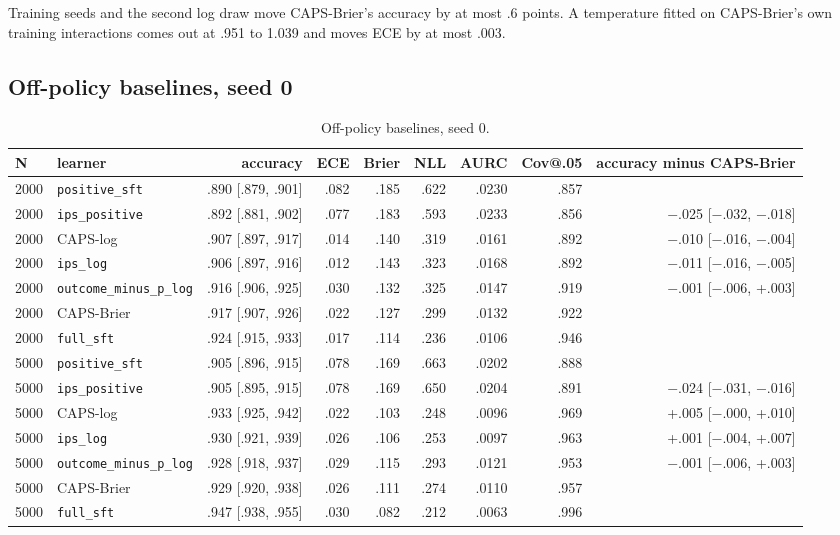 \documentclass[10pt,letterpaper]{article}
\theoremstyle{plain}
\begin{document}
Training seeds and the second log draw move CAPS-Brier's accuracy by at most .6 points. A temperature fitted on CAPS-Brier's own training interactions comes out at .951 to 1.039 and moves ECE by at most .003.

\subsection{Off-policy baselines, seed 0}\label{sec:A3}

\begin{table}[H]
\centering
\footnotesize
\setlength{\tabcolsep}{3pt}
\caption{Off-policy baselines, seed 0.}
\label{tab:A3}
\begin{adjustbox}{max width=\textwidth}
\begin{tabular}{llrrrrrrr}
\toprule
N & learner & accuracy & ECE & Brier & NLL & AURC & Cov@.05 & accuracy minus CAPS-Brier \\
\midrule
2000 & \texttt{positive\_sft} & .890 [.879, .901] & .082 & .185 & .622 & .0230 & .857 &  \\
2000 & \texttt{ips\_positive} & .892 [.881, .902] & .077 & .183 & .593 & .0233 & .856 & $-$.025 [$-$.032, $-$.018] \\
2000 & CAPS-log & .907 [.897, .917] & .014 & .140 & .319 & .0161 & .892 & $-$.010 [$-$.016, $-$.004] \\
2000 & \texttt{ips\_log} & .906 [.897, .916] & .012 & .143 & .323 & .0168 & .892 & $-$.011 [$-$.016, $-$.005] \\
2000 & \texttt{outcome\_minus\_p\_log} & .916 [.906, .925] & .030 & .132 & .325 & .0147 & .919 & $-$.001 [$-$.006, +.003] \\
2000 & CAPS-Brier & .917 [.907, .926] & .022 & .127 & .299 & .0132 & .922 &  \\
2000 & \texttt{full\_sft} & .924 [.915, .933] & .017 & .114 & .236 & .0106 & .946 &  \\
5000 & \texttt{positive\_sft} & .905 [.896, .915] & .078 & .169 & .663 & .0202 & .888 &  \\
5000 & \texttt{ips\_positive} & .905 [.895, .915] & .078 & .169 & .650 & .0204 & .891 & $-$.024 [$-$.031, $-$.016] \\
5000 & CAPS-log & .933 [.925, .942] & .022 & .103 & .248 & .0096 & .969 & +.005 [$-$.000, +.010] \\
5000 & \texttt{ips\_log} & .930 [.921, .939] & .026 & .106 & .253 & .0097 & .963 & +.001 [$-$.004, +.007] \\
5000 & \texttt{outcome\_minus\_p\_log} & .928 [.918, .937] & .029 & .115 & .293 & .0121 & .953 & $-$.001 [$-$.006, +.003] \\
5000 & CAPS-Brier & .929 [.920, .938] & .026 & .111 & .274 & .0110 & .957 &  \\
5000 & \texttt{full\_sft} & .947 [.938, .955] & .030 & .082 & .212 & .0063 & .996 &  \\
\bottomrule
\end{tabular}
\end{adjustbox}
\end{table}
\end{document}
